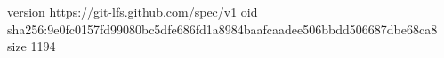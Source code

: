 version https://git-lfs.github.com/spec/v1
oid sha256:9e0fc0157fd99080bc5dfe686fd1a8984baafcaadee506bbdd506687dbe68ca8
size 1194
